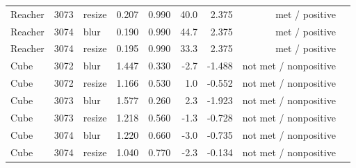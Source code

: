 \begin{table}[t]
\begin{tabular}{lrlrrrrrl}
Reacher & 3073 & resize & 0.207 & 0.990 & 40.0 & 2.375 & met / positive \\
Reacher & 3074 & blur & 0.190 & 0.990 & 44.7 & 2.375 & met / positive \\
Reacher & 3074 & resize & 0.195 & 0.990 & 33.3 & 2.375 & met / positive \\
Cube & 3072 & blur & 1.447 & 0.330 & -2.7 & -1.488 & not met / nonpositive \\
Cube & 3072 & resize & 1.166 & 0.530 & 1.0 & -0.552 & not met / nonpositive \\
Cube & 3073 & blur & 1.577 & 0.260 & 2.3 & -1.923 & not met / nonpositive \\
Cube & 3073 & resize & 1.218 & 0.560 & -1.3 & -0.728 & not met / nonpositive \\
Cube & 3074 & blur & 1.220 & 0.660 & -3.0 & -0.735 & not met / nonpositive \\
Cube & 3074 & resize & 1.040 & 0.770 & -2.3 & -0.134 & not met / nonpositive \\
\bottomrule
\end{tabular}
\end{table}

